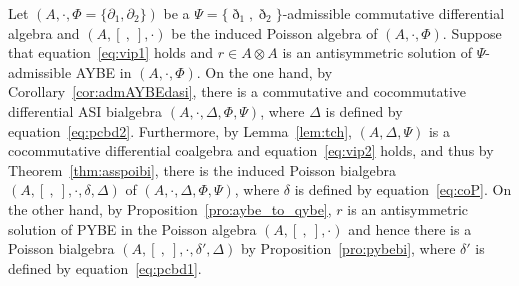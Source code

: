 \documentclass[10pt,a4paper]{amsart}
\numberwithin{equation}{section}
\begin{document}
Let $(A, \cdot, \Phi = \{\partial_1, \partial_2\})$ be a $\Psi = \{\eth_1, \eth_2\}$-admissible commutative differential algebra and $(A, [\ ,\ ], \cdot)$ be the induced Poisson algebra of $(A, \cdot, \Phi)$.
Suppose that equation~\eqref{eq:vip1} holds and $r \in A \otimes A$ is an antisymmetric solution of $\Psi$-admissible AYBE in $(A, \cdot, \Phi)$.
On the one hand, by Corollary~\ref{cor:admAYBEdasi}, there is a commutative and cocommutative differential ASI bialgebra $(A, \cdot, \Delta, \Phi, \Psi)$, where $\Delta$ is defined by equation~\eqref{eq:pcbd2}.
Furthermore, by Lemma~\ref{lem:tch}, $(A, \Delta, \Psi)$ is a cocommutative differential coalgebra and equation~\eqref{eq:vip2} holds, and thus by Theorem~\ref{thm:asspoibi},
there is the induced Poisson bialgebra $(A,[\ ,\ ], \cdot, \delta, \Delta)$ of $(A, \cdot, \Delta, \Phi, \Psi)$,
where $\delta$ is defined by equation~\eqref{eq:coP}.
On the other hand, by Proposition~\ref{pro:aybe_to_qybe}, $r$ is an antisymmetric solution of PYBE in the Poisson algebra $(A, [\ ,\ ], \cdot)$
and hence there is a Poisson bialgebra $(A,[\ ,\ ], \cdot, \delta', \Delta)$ by Proposition~\ref{pro:pybebi},
where $\delta'$ is defined by equation~\eqref{eq:pcbd1}.
\end{document}
